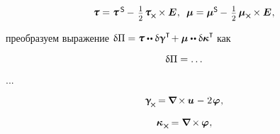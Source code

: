 \begin{otherlanguage}{russian}
\begin{equation*}
\begin{array}{c}
%
\forcestresstensor = \forcestresstensor^{\hspace{.32ex}\mathsf{S}} \hspace{-0.1ex} - \hspace{.25ex} \smalldisplaystyleonehalf \hspace{.2ex} \forcestresstensor_{\hspace{-0.1ex}\Xcompanion} \hspace{-0.1ex} \times \UnitDyad
\hspace{.1ex} ,
\;\:
%
\couplestresstensor = \couplestresstensor^{\mathsf{S}} \hspace{-0.1ex} - \hspace{.25ex} \smalldisplaystyleonehalf \hspace{.32ex} \couplestresstensor_{\Xcompanion} \hspace{-0.1ex} \times \UnitDyad
\hspace{.1ex} ,
\end{array}
\end{equation*}

\noindent
преобразуем выражение
${\variation{\potential} = \forcestresstensor \dotdotp \variation{\distortiontensor}^{\T} \hspace{-0.3ex}
+ \couplestresstensor \dotdotp \variation{\wrynesstensor}^{\T} \hspace{-0.25ex}}$
как

\nopagebreak\vspace{-0.1em}\begin{equation}
\updelta\hspace{-0.1ex}\Pi = \ldots
\end{equation}

...

\begin{equation*}
\distortiontensor_{\hspace{-0.25ex}\Xcompanion} \hspace{-0.16ex}
= \hspace{-0.1ex} \boldnabla \hspace{-0.16ex} \times \hspace{-0.1ex} \fieldofdisplacements \hspace{.12ex} - \hspace{.12ex} 2 \hspace{.16ex} \fieldofrotations
\hspace{.1ex} ,
\end{equation*}

\begin{equation*}
\wrynesstensor_{\hspace{.15ex}\Xcompanion} \hspace{-0.16ex}
= \boldnabla \hspace{-0.16ex} \times \hspace{-0.1ex} \fieldofrotations
\hspace{.1ex} ,
\end{equation*}


\end{otherlanguage}
